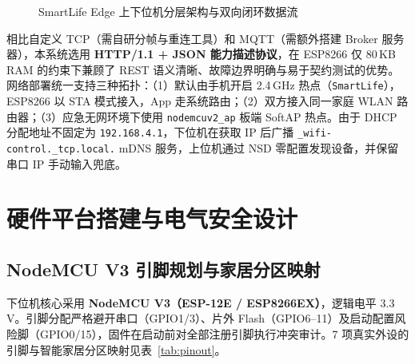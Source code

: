 \documentclass[10.5pt,a4paper]{ctexart}
\newcommand{\code}[1]{{\ttfamily\small\nolinkurl{#1}}}
\begin{document}
\begin{figure}[htbp]
{%
}
\caption{SmartLife Edge 上下位机分层架构与双向闭环数据流}
\label{fig:sys-arch}
\end{figure}

相比自定义 TCP（需自研分帧与重连工具）和 MQTT（需额外搭建 Broker 服务器），本系统选用 \textbf{HTTP/1.1 + JSON 能力描述协议}，在 ESP8266 仅 80\,KB RAM 的约束下兼顾了 REST 语义清晰、故障边界明确与易于契约测试的优势。网络部署统一支持三种拓扑：（1）默认由手机开启 2.4\,GHz 热点（\code{SmartLife}），ESP8266 以 STA 模式接入，App 走系统路由；（2）双方接入同一家庭 WLAN 路由器；（3）应急无网环境下使用 \code{nodemcuv2_ap} 板端 SoftAP 热点。由于 DHCP 分配地址不固定为 \code{192.168.4.1}，下位机在获取 IP 后广播 \code{_wifi-control._tcp.local.} mDNS 服务，上位机通过 NSD 零配置发现设备，并保留串口 IP 手动输入兜底。

\section{硬件平台搭建与电气安全设计}

\subsection{NodeMCU V3 引脚规划与家居分区映射}
下位机核心采用 \textbf{NodeMCU V3（ESP-12E / ESP8266EX）}，逻辑电平 3.3\,V。引脚分配严格避开串口（GPIO1/3）、片外 Flash（GPIO6--11）及启动配置风险脚（GPIO0/15），固件在启动前对全部注册引脚执行冲突审计。7 项真实外设的引脚与智能家居分区映射见表~\ref{tab:pinout}。
\end{document}
